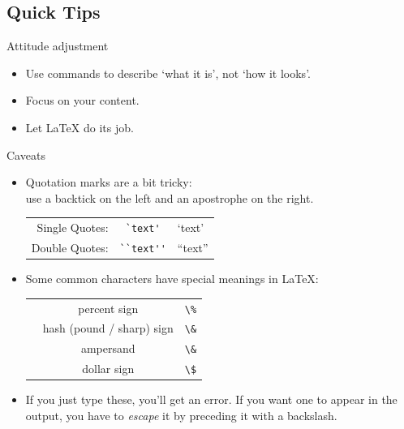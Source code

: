 \subsection{Quick Tips}

\begin{frame}[fragile]{Attitude adjustment}

    \begin{itemize}
        \item Use commands to describe `what it is', not `how it looks'.
        \item Focus on your content.
        \item Let \LaTeX{} do its job.
    \end{itemize}
\end{frame}


\begin{frame}[fragile]{Caveats}
    \small
    \begin{itemize}
        \item Quotation marks are a bit tricky:\\
              use a backtick \keystroke{\`{}} on the left and an apostrophe \keystroke{\'{}} on the right.
              \begin{tabular}{rcl}
                  Single Quotes: & \verb|`text'|   & `text'   \\
                  Double Quotes: & \verb|``text''| & ``text''
              \end{tabular}

        \item Some common characters have special meanings in \LaTeX:
              \\[1ex]
              \begin{tabular}{rcl}
                  \keystrokebftt{\%} & percent sign              & \verb|\%| \\
                  \keystrokebftt{\#} & hash (pound / sharp) sign & \verb|\&| \\
                  \keystrokebftt{\&} & ampersand                 & \verb|\&| \\
                  \keystrokebftt{\$} & dollar sign               & \verb|\$|
              \end{tabular}
        \item If you just type these, you'll get an error. If you want one to appear in the output, you have to \emph{escape} it by preceding it with a backslash.
    \end{itemize}
\end{frame}

